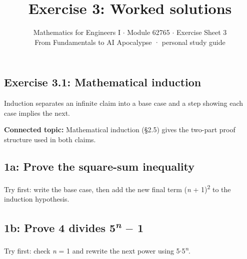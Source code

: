 \documentclass[11pt]{article}
\title{\sffamily\bfseries\color{FAUblue}Exercise 3: Worked solutions}
\author{Mathematics for Engineers I \ensuremath{\cdot} Module 62765 \ensuremath{\cdot} Exercise Sheet 3\\[2pt]\small From Fundamentals to AI Apocalypse · personal study guide}
\date{}
\begin{document}
\maketitle
\begingroup\footnotesize\setlength{\parskip}{0pt}\tableofcontents\endgroup
\clearpage

\begin{keepsection}
\section{Exercise 3.1: Mathematical induction}

Induction separates an infinite claim into a base case and a step showing each case implies the next.

\textbf{Connected topic:} Mathematical induction (§2.5) gives the two-part proof structure used in both claims.

\begin{keepsection}
\subsection{1a: Prove the square-sum inequality}

Try first: write the base case, then add the new final term (\textit{n} + 1)\textsuperscript{2} to the induction hypothesis.

\end{keepsection}

\begin{keepsection}
\subsection{1b: Prove 4 divides 5\textsuperscript{\textit{n}} \ensuremath{-} 1}

Try first: check \textit{n} = 1 and rewrite the next power using 5\ensuremath{\cdot}5\textsuperscript{\textit{n}}.

\end{keepsection}
\end{keepsection}
\end{document}
